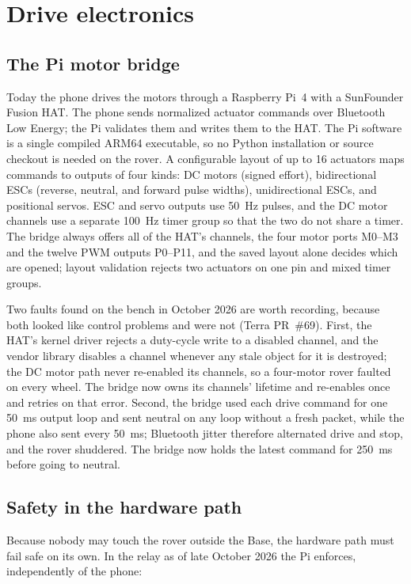 \section{Drive electronics}
\label{sec:rover-electronics}

\subsection{The Pi motor bridge}

Today the phone drives the motors through a Raspberry Pi~4 with a SunFounder Fusion HAT.
The phone sends normalized actuator commands over Bluetooth Low Energy; the Pi validates them and writes them to the HAT.
The Pi software is a single compiled ARM64 executable, so no Python installation or source checkout is needed on the rover.
A configurable layout of up to 16 actuators maps commands to outputs of four kinds: DC motors (signed effort), bidirectional ESCs (reverse, neutral, and forward pulse widths), unidirectional ESCs, and positional servos.
ESC and servo outputs use 50~Hz pulses, and the DC motor channels use a separate 100~Hz timer group so that the two do not share a timer.
The bridge always offers all of the HAT's channels, the four motor ports M0--M3 and the twelve PWM outputs P0--P11, and the saved layout alone decides which are opened; layout validation rejects two actuators on one pin and mixed timer groups.

Two faults found on the bench in October 2026 are worth recording, because both looked like control problems and were not (Terra PR~\#69).
First, the HAT's kernel driver rejects a duty-cycle write to a disabled channel, and the vendor library disables a channel whenever any stale object for it is destroyed; the DC motor path never re-enabled its channels, so a four-motor rover faulted on every wheel.
The bridge now owns its channels' lifetime and re-enables once and retries on that error.
Second, the bridge used each drive command for one 50~ms output loop and sent neutral on any loop without a fresh packet, while the phone also sent every 50~ms; Bluetooth jitter therefore alternated drive and stop, and the rover shuddered.
The bridge now holds the latest command for 250~ms before going to neutral.

\subsection{Safety in the hardware path}

Because nobody may touch the rover outside the Base, the hardware path must fail safe on its own.
In the relay as of late October 2026 the Pi enforces, independently of the phone:

